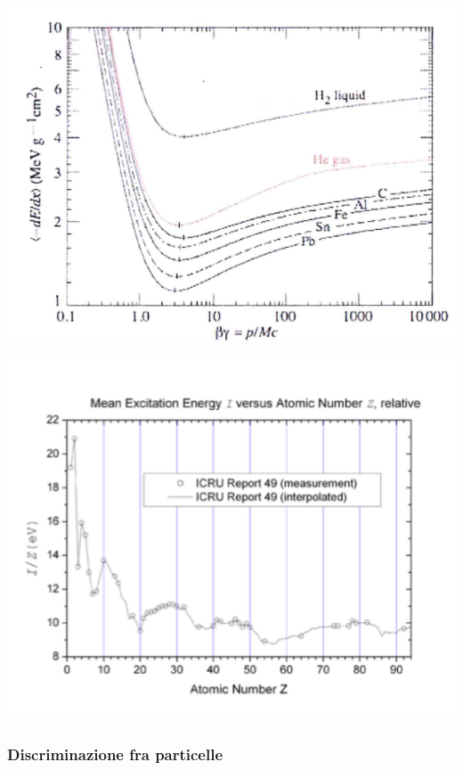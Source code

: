 \documentclass[10pt, a4paper]{scrartcl}
\numberwithin{equation}{subsection}
\theoremstyle{style1}
\begin{document}
\begin{center}
	\begin{minipage}{.45\columnwidth}
	\centering
	\includegraphics[width=\columnwidth]{bb.png}
	\end{minipage}
\hfill
	\begin{minipage}{0.45\columnwidth}
	\centering
	\includegraphics[width=\columnwidth]{iznat.png}
	\end{minipage}
\end{center}
\subsubsection{Discriminazione fra particelle}
\end{document}

